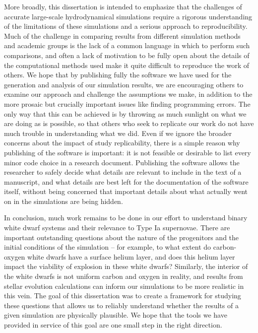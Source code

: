 \documentclass[12pt]{article}
\begin{document}
More broadly, this dissertation is intended to emphasize that the challenges of
accurate large-scale hydrodynamical simulations require a rigorous understanding of
the limitations of these simulations and a serious approach to reproducibility. Much
of the challenge in comparing results from different simulation methods and academic
groups is the lack of a common language in which to perform such comparisons, and often
a lack of motivation to be fully open about the details of the computational methods used
make it quite difficult to reproduce the work of others. We hope that by publishing fully
the software we have used for the generation and analysis of our simulation results, we
are encouraging others to examine our approach and challenge the assumptions we make, in
addition to the more prosaic but crucially important issues like finding programming errors.
The only way that this can be achieved is by throwing as much sunlight on what we are doing
as is possible, so that others who seek to replicate our work do not have much trouble in
understanding what we did. Even if we ignore the broader concerns about the impact of
study replicability, there is a simple reason why publishing of the software is important:
it is not feasible or desirable to list every minor code choice in a research document.
Publishing the software allows the researcher to safely decide what details are relevant
to include in the text of a manuscript, and what details are best left for the documentation
of the software itself, without being concerned that important details about what actually
went on in the simulations are being hidden.

In conclusion, much work remains to be done in our effort to understand binary white dwarf
systems and their relevance to Type Ia supernovae. There are important outstanding questions
about the nature of the progenitors and the initial conditions of the simulation -- for example,
to what extent do carbon-oxygen white dwarfs have a surface helium layer, and does this helium
layer impact the viability of explosion in these white dwarfs? Similarly, the interior of the
white dwarfs is not uniform carbon and oxygen in reality, and results from stellar evolution
calculations can inform our simulations to be more realistic in this vein. The goal of this
dissertation was to create a framework for studying these questions that allows us to reliably
understand whether the results of a given simulation are physically plausible. We hope that the
tools we have provided in service of this goal are one small step in the right direction.
\end{document}

